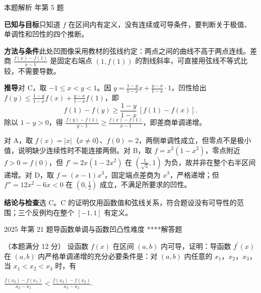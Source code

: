 \documentclass[UTF8,zihao=-4,fontset=fandol]{ctexart}
\newcounter{BankQuestion}
\newcommand{\QuestionPage}[7]{%
  \stepcounter{BankQuestion}%
  \par\noindent\begin{minipage}{\linewidth}
  \raggedright
  {\small\textcolor{black!60}{#3\quad #5\quad 难度 #7}\hfill\textcolor{accent}{#2}}\par\smallskip}
\newcommand{\QuestionEnd}{\end{minipage}\par\medskip}
\newcommand{\QuestionPage}[7]{%
  \clearpage
  \stepcounter{BankQuestion}%
  {\small\textcolor{accent}{#1\hfill #2}}\par\medskip
  {\small\textcolor{black!60}{#3\quad #5\quad 难度 #7\hfill \arabic{BankQuestion} / 234}}\par\vspace{9bp}}
\newcommand{\QuestionEnd}{}
\newenvironment{QuestionSolution}[1]{%
  \clearpage
  {\small\textcolor{black!60}{本题解析\quad #1}}\par\medskip
}{\par\clearpage}
\begin{document}
\begin{QuestionSolution}{2026 年第 5 题}
\textbf{已知与目标}\quad 只知道 \(f\) 在区间内有定义，没有连续或可导条件，要判断关于极值、单调性和凹性的四个推断。

\textbf{方法与条件}\quad 此处凹图像采用教材的弦线约定：两点之间的曲线不高于两点连线。差商 \(\frac{f(x)-f(1)}{x-1}\) 是固定右端点 \((1,f(1))\) 的割线斜率，可直接用弦线不等式比较，不需要导数。

\textbf{推导}\quad 对 C，取 \(-1\le x<y<1\)。因 \(y=\frac{1-y}{1-x}x+\frac{y-x}{1-x}\cdot1\)，凹性给出 \(f(y)\le\frac{1-y}{1-x}f(x)+\frac{y-x}{1-x}f(1)\)，即
\[
f(1)-f(y)\ge \frac{1-y}{1-x}\,[f(1)-f(x)].
\]
除以 \(1-y>0\)，得 \(\frac{f(y)-f(1)}{y-1}\ge\frac{f(x)-f(1)}{x-1}\)，即差商单调递增。

对 A，取 \(f(x)=|x|\)（\(x\ne0\)）、\(f(0)=2\)，两侧单调性成立，但零点不是极小值，说明缺少连续性时不能连接两侧。对 B，取 \(f=x^2(1-x^2)\)，零点附近 \(f>0=f(0)\)，但 \(f'=2x(1-2x^2)\) 在 \((\frac1{\sqrt2},1)\) 为负，故并非在整个右半区间递增。对 D，取 \(f=(x-1)x^3\)，固定端点差商为 \(x^3\)，严格递增；但 \(f''=12x^2-6x<0\) 在 \((0,\frac12)\) 成立，不满足所要求的凹性。

\textbf{结论与检查}\quad 选 \(\boxed{\mathrm C}\)。C 的证明仅用函数值和弦线关系，符合题设没有可导性的范围；三个反例均在整个 \([-1,1]\) 有定义。
\end{QuestionSolution}

\QuestionPage{2.6 函数性态的研究}{解答题}{2025 年第 21 题}{3}{导函数单调与函数凹凸性}{129 / 234}{****}
（本题满分 12 分）
设函数 \(f\left( x \right)\) 在区间 \(\left( a, b \right)\) 内可导，证明：导函数 \(f^{\prime}\left( x \right)\) 在 \(\left( a, b \right)\) 内严格单调递增的充分必要条件是：对 \(\left( a, b \right)\) 内任意的 \(x_{1}\)，\(x_{2}\)，\(x_{3}\)，当 \(x_{1} < x_{2} < x_{3}\) 时，有

\(\frac{f\left( x_{2} \right) - f\left( x_{1} \right)}{x_{2} - x_{1}} < \frac{f\left( x_{3} \right) - f\left( x_{2} \right)}{x_{3} - x_{2}}\).
\QuestionEnd
\end{document}
